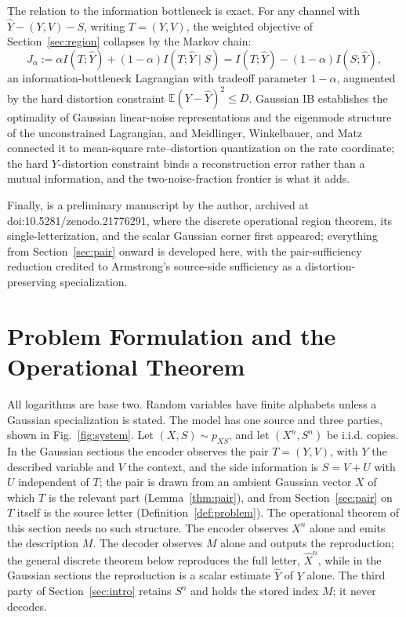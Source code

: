 \documentclass[11pt,onecolumn]{IEEEtran}
\newcommand{\E}{\mathbb{E}}
\newcommand{\hXn}{\widehat{X}^{n}}
\newcommand{\hY}{\widehat{Y}}
\begin{document}
The relation to the information bottleneck \cite{tishby1999} is exact.
For any channel with $\hY-(Y,V)-S$, writing $T=(Y,V)$, the weighted
objective of Section~\ref{sec:region} collapses by the Markov chain:
\begin{equation}
J_\alpha:=\alpha I(T;\hY)+(1-\alpha)I(T;\hY\mid S)
=I(T;\hY)-(1-\alpha)I(S;\hY),
\label{eq:ib-identity}
\end{equation}
an information-bottleneck Lagrangian with tradeoff parameter
$1-\alpha$, augmented by the hard distortion constraint
$\E(Y-\hY)^2\le D$. Gaussian IB \cite{chechik2005} establishes the
optimality of Gaussian linear-noise representations and the eigenmode
structure of the unconstrained Lagrangian, and Meidlinger, Winkelbauer,
and Matz \cite{meidlinger2014} connected it to mean-square
rate--distortion quantization on the rate coordinate; the hard
$Y$-distortion constraint binds a reconstruction error rather than a
mutual information, and the two-noise-fraction frontier is what it adds.

Finally, \cite{bond2026landauer} is a preliminary manuscript by the
author, archived at doi:10.5281/zenodo.21776291, where the discrete
operational region theorem, its single-letterization, and the scalar
Gaussian corner first appeared; everything from Section~\ref{sec:pair}
onward is developed here, with the pair-sufficiency reduction credited
to Armstrong's source-side sufficiency \cite{armstrong2026} as a
distortion-preserving specialization.

\section{Problem Formulation and the Operational Theorem}
\label{sec:operational}

All logarithms are base two. Random variables have finite alphabets unless a
Gaussian specialization is stated. The model has one source and three
parties, shown in Fig.~\ref{fig:system}. Let $(X,S)\sim p_{XS}$, and let
$(X^n,S^n)$ be i.i.d. copies. In the Gaussian sections the encoder observes
the pair $T=(Y,V)$, with $Y$ the described variable and $V$ the context, and
the side information is $S=V+U$ with $U$ independent of $T$; the pair is
drawn from an ambient Gaussian vector $X$ of which $T$ is the relevant
part (Lemma~\ref{thm:pair}), and from Section~\ref{sec:pair} on $T$
itself is the source letter (Definition~\ref{def:problem}). The
operational theorem of this section needs no such structure. The encoder observes $X^n$
alone and emits the description $M$. The decoder observes $M$ alone and
outputs the reproduction; the general discrete theorem below reproduces the
full letter, $\hXn$, while in the Gaussian sections the reproduction is a
scalar estimate $\hY$ of $Y$ alone. The third party of
Section~\ref{sec:intro} retains $S^n$ and holds the stored index $M$; it
never decodes.
\end{document}
